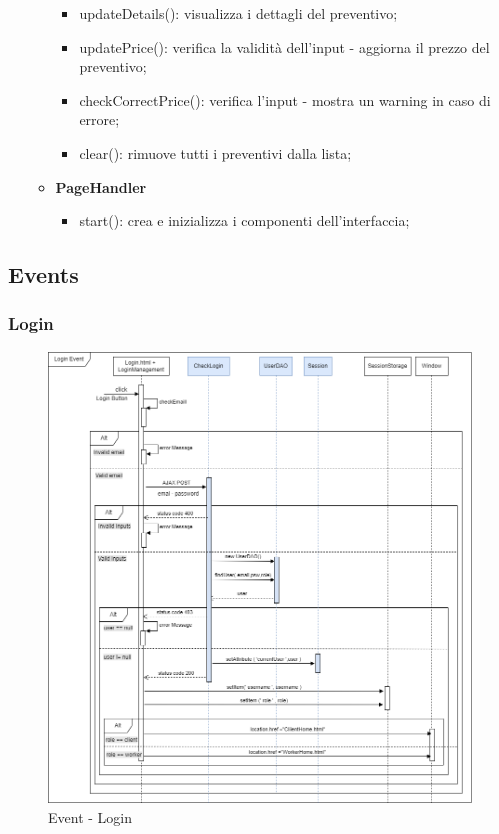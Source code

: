 \documentclass[a4paper, 12pt]{article}
\begin{document}
\begin{itemize}
\begin{itemize}
\begin{itemize}
			\item updateDetails(): visualizza i dettagli del preventivo;
			\item updatePrice(): verifica la validità dell'input - aggiorna il prezzo del preventivo;
			\item checkCorrectPrice(): verifica l'input - mostra un warning in caso di errore;
			\item clear(): rimuove tutti i preventivi dalla lista;
		\end{itemize}
		\item \textbf{PageHandler}
		\begin{itemize}
			\item start(): crea e inizializza i componenti dell'interfaccia;
		\end{itemize}
	\end{itemize}
\end{itemize}
\subsection{Events}
\subsubsection{Login}
\begin{figure}[h!]
	\centering
	\includegraphics[width=1\textwidth]{RIA_images/LoginEvent.png}
	\caption{Event - Login}
	\label{figure:LoginRIA}
\end{figure}
\end{document}
